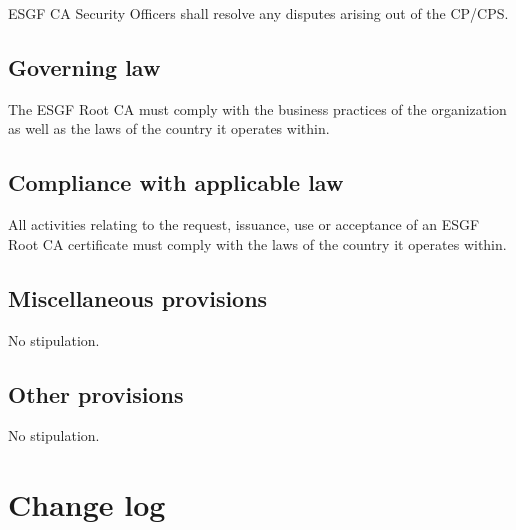 ESGF CA Security Officers shall resolve any disputes arising out of the
CP/CPS.

\subsection{Governing law}\label{governing-law}
The ESGF Root CA must comply with the business practices of the organization as well as the laws of the country it operates within.

\subsection{Compliance with applicable law}\label{compliance-with-applicable-law}

All activities relating to the request, issuance, use or acceptance of an ESGF Root CA certificate must comply with the laws of the country it operates within.

\subsection{Miscellaneous provisions}\label{miscellaneous-provisions}

No stipulation.

\subsection{Other provisions}\label{other-provisions}

No stipulation.

\section{Change log}\label{change-log}

\newpage
